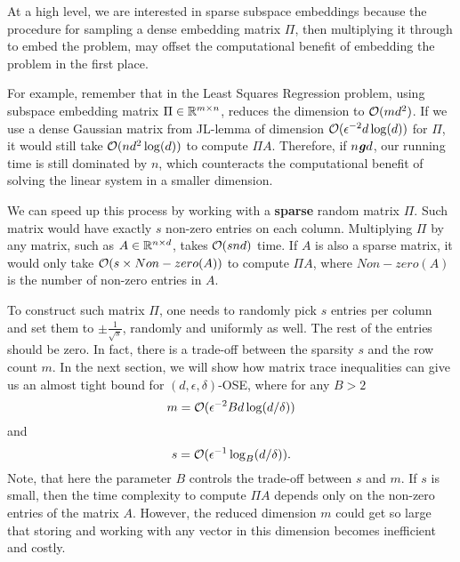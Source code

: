 At a high level, we are interested in sparse subspace embeddings because the procedure for sampling a dense embedding matrix $\Pi$, then multiplying it through to embed the problem, 
may offset the computational benefit of embedding the problem in the first place. 

For example, remember that in the Least Squares Regression problem, using subspace embedding matrix $\Pi \in \mathbb R^{m \times n}$, reduces the dimension to $\mathcal{O}({m d ^2})$. If we use a dense Gaussian matrix from JL-lemma of dimension $\mathcal{O}(\epsilon ^ {-2}d\log(d))$ for $\Pi$, it would still take $\mathcal{O}({n d^2 \log(d)})$ to compute $\Pi A$. Therefore, if $n \ggreater d$, our running time is still dominated by $n$, which counteracts the computational benefit of solving the linear system in a smaller dimension. 


We can speed up this process by working with a \textbf{sparse} random matrix $\Pi$. Such matrix would have exactly $s$ non-zero entries on each column. Multiplying $\Pi$ by any matrix, such as $A \in \mathbb R^{n \times d}$, takes $\mathcal{O}(snd)$ time. If $A$ is also a sparse matrix, it would only take $\mathcal{O}(s \times Non-zero(A))$ to compute $\Pi A$, where $Non-zero(A)$ is the number of non-zero entries in $A$. 

To construct such matrix $\Pi$, one needs to randomly pick $s$ entries per column and set them to $\pm \frac{1}{\sqrt{s}}$, randomly and uniformly as well. The rest of the entries should be zero. In fact, there is a trade-off between the sparsity $s$ and the row count $m$. In the next section, we will show how matrix trace inequalities can give us an almost tight bound for $(d, \epsilon, \delta)$-OSE, where for any $B > 2$
$$m = \mathcal{O}(\epsilon^{-2}Bd\log(d/\delta))$$ and $$s = \mathcal{O}(\epsilon^{-1}\log_B(d/\delta)).$$ Note, that here the parameter $B$ controls the trade-off between $s$ and $m$. If $s$ is small, then the time complexity to compute $\Pi A$ depends only on the non-zero entries of the matrix $A$. However, the reduced dimension $m$ could get so large that storing and working with any vector in this dimension becomes inefficient and costly.  




